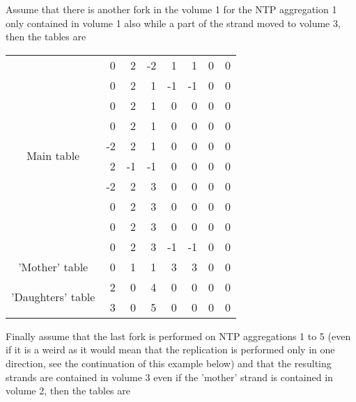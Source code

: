 Assume that there is another fork in the volume 1 for the NTP aggregation 1 only contained in volume 1 also while a part of the strand moved to volume 3, then the tables are
\begin{center}
  \begin{tabular}{|c|r|r|r|r|r|r|r|}
     \hline
     \multirow{10}{*}{Main table} & 0 &  2 & -2 &  1 &  1 & 0 & 0 \\
     &  0 &  2 &  1 & -1 & -1 & 0 & 0 \\
     &  0 &  2 &  1 &  0 &  0 & 0 & 0 \\
     &  0 &  2 &  1 &  0 &  0 & 0 & 0 \\
     & -2 &  2 &  1 &  0 &  0 & 0 & 0 \\
     &  2 & -1 & -1 &  0 &  0 & 0 & 0 \\
     & -2 &  2 &  3 &  0 &  0 & 0 & 0 \\
     &  0 &  2 &  3 &  0 &  0 & 0 & 0 \\
     &  0 &  2 &  3 &  0 &  0 & 0 & 0 \\
     &  0 &  2 &  3 & -1 & -1 & 0 & 0 \\
     \hline \hline
     'Mother' table & 0 & 1 & 1 & 3 & 3 & 0 & 0 \\
     \hline \hline
     \multirow{2}{*}{'Daughters' table} & 2 & 0 & 4 & 0 & 0 & 0 & 0 \\
     & 3 & 0 & 5 & 0 & 0 & 0 & 0 \\
     \hline
   \end{tabular}
\end{center}
Finally assume that the last fork is performed on NTP aggregations 1 to 5 (even if it is a weird as it would mean that the replication is performed only in one direction, see the continuation of this example below) and that the resulting strands are contained in volume 3 even if the 'mother' strand is contained in volume 2, then the tables are
